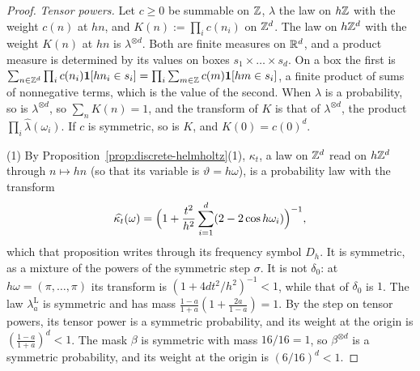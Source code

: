 \begin{proof}
\emph{Tensor powers.} Let $c \ge 0$ be summable on $\mathbb{Z}$, $\lambda$ the law on $h\mathbb{Z}$ with the
weight $c(n)$ at $hn$, and $K(n) := \prod_ic(n_i)$ on $\mathbb{Z}^d$. The law on $h\mathbb{Z}^d$ with the
weight $K(n)$ at $hn$ is $\lambda^{\otimes d}$. Both are finite measures on $\mathbb{R}^d$, and a product
measure is determined by its values on boxes $s_1 \times \dots \times s_d$. On a box the first is
$\sum_{n \in \mathbb{Z}^d}\prod_ic(n_i)\mathbf{1}[hn_i \in s_i] = \prod_i\sum_{m \in \mathbb{Z}}
c(m)\mathbf{1}[hm \in s_i]$, a finite product of sums of nonnegative terms, which is the value of
the second. When $\lambda$ is a probability, so is $\lambda^{\otimes d}$, so $\sum_nK(n) = 1$, and
the transform of $K$ is that of $\lambda^{\otimes d}$, the product $\prod_i\widehat{\lambda}(\omega_i)$.
If $c$ is symmetric, so is $K$, and $K(0) = c(0)^d$.

(1) By Proposition~\ref{prop:discrete-helmholtz}(1), $\kappa_t$, a law on $\mathbb{Z}^d$ read on $h\mathbb{Z}^d$
through $n \mapsto hn$ (so that its variable is $\vartheta = h\omega$), is a probability law with the
transform
\[
\widehat{\kappa_t}(\omega) = \Bigl(1 + \frac{t^2}{h^2}\sum_{i=1}^d(2 - 2\cos h\omega_i)\Bigr)^{-1},
\]
which that proposition writes through its frequency symbol $D_h$. It is symmetric, as a mixture of
the powers of the symmetric step $\sigma$. It is not $\delta_0$: at $h\omega = (\pi, \dots, \pi)$
its transform is $(1 + 4dt^2/h^2)^{-1} < 1$, while that of $\delta_0$ is $1$. The law
$\lambda^{\mathrm L}_a$ is symmetric and has mass $\tfrac{1-a}{1+a}(1 + \tfrac{2a}{1-a}) = 1$. By
the step on tensor powers, its tensor power is a symmetric probability, and its weight at the origin
is $(\tfrac{1-a}{1+a})^d < 1$. The mask $\beta$ is symmetric with mass $16/16 = 1$, so
$\beta^{\otimes d}$ is a symmetric probability, and its weight at the origin is $(6/16)^d < 1$.


\end{proof}
